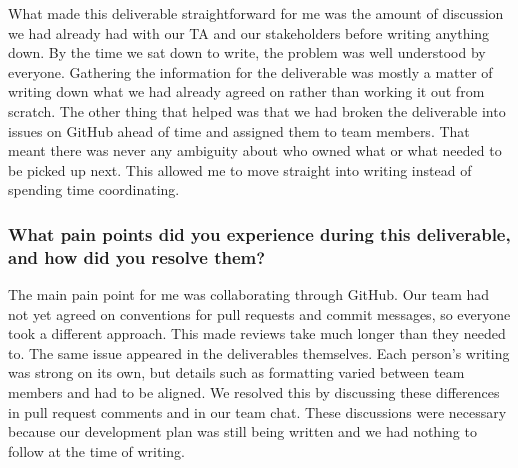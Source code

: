 \documentclass{article}
\begin{document}
What made this deliverable straightforward for me was the amount of discussion
we had already had with our TA and our stakeholders before writing anything
down. By the time we sat down to write, the problem was well understood by
everyone. Gathering the information for the deliverable was mostly a matter
of writing down what we had already agreed on rather than working it out from
scratch. The other thing that helped was that we had broken the deliverable into
issues on GitHub ahead of time and assigned them to team members. That meant
there was never any ambiguity about who owned what or what needed to be picked
up next. This allowed me to move straight into writing instead of spending time
coordinating.

\subsubsection*{What pain points did you experience during this deliverable,
and how did you resolve them?}

The main pain point for me was collaborating through GitHub. Our team had not
yet agreed on conventions for pull requests and commit messages, so everyone
took a different approach. This made reviews take much longer than they needed
to. The same issue appeared in the deliverables themselves. Each person's
writing was strong on its own, but details such as formatting varied between
team members and had to be aligned. We resolved this by discussing these
differences in pull request comments and in our team chat. These discussions
were necessary because our development plan was still being written and we had
nothing to follow at the time of writing.
\end{document}
